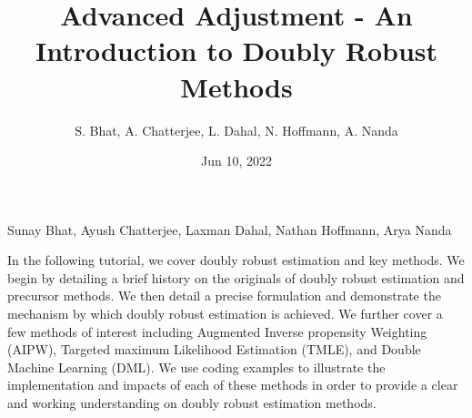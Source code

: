 \documentclass[letterpaper,10pt,english]{jupyterBook}
\title{Advanced Adjustment - An Introduction to Doubly Robust Methods}
\date{Jun 10, 2022}
\author{S.\@{} Bhat, A.\@{} Chatterjee, L.\@{} Dahal, N.\@{} Hoffmann, A.\@{} Nanda}
\begin{document}
\pagestyle{empty}
\sphinxmaketitle
\pagestyle{plain}
\sphinxtableofcontents
\pagestyle{normal}
\label{\detokenize{intro::doc}}


\begin{DUlineblock}{0em}
\item[] 
\end{DUlineblock}

\sphinxAtStartPar
{} Sunay Bhat, Ayush Chatterjee, Laxman Dahal, Nathan Hoffmann, Arya Nanda

\begin{DUlineblock}{0em}
\item[] 
\end{DUlineblock}

\sphinxAtStartPar
In the following tutorial, we cover doubly robust estimation and key methods. We begin by detailing a brief history on the originals of doubly robust estimation and precursor methods. We then detail a precise formulation and demonstrate the mechanism by which doubly robust estimation is achieved. We further cover a few methods of interest including Augmented Inverse propensity Weighting (AIPW), Targeted maximum Likelihood Estimation (TMLE), and Double Machine Learning (DML). We use coding examples to illustrate the implementation and impacts of each of these methods in order to provide a clear and working understanding on doubly robust estimation methods.

\sphinxstepscope
\end{document}
